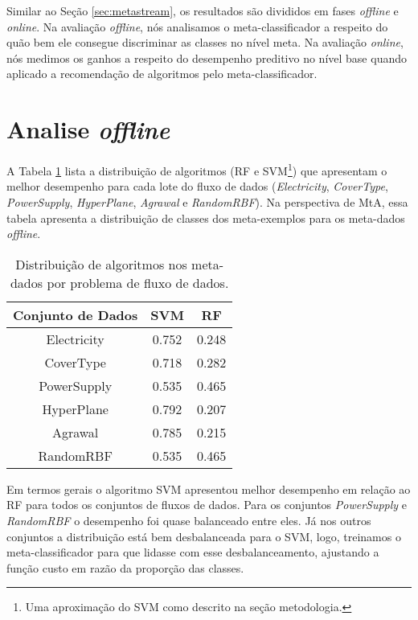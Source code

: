 \label{chap:resultados}
Similar ao Seção \ref{sec:metastream}, os resultados são divididos em fases \textit{offline} e \textit{online}. Na avaliação \textit{offline}, nós analisamos o meta-classificador a respeito do quão bem ele consegue discriminar as classes no nível meta. Na avaliação \textit{online}, nós medimos os ganhos a respeito do desempenho preditivo no nível base quando aplicado a recomendação de algoritmos pelo meta-classificador.

\section{Analise \textit{offline}}

A Tabela \ref{tab:algo_dist} lista a distribuição de algoritmos (RF e SVM\footnote{Uma aproximação do SVM como descrito na seção metodologia.}) que apresentam o melhor desempenho para cada lote do fluxo de dados (\textit{Electricity}, \textit{CoverType}, \textit{PowerSupply}, \textit{HyperPlane}, \textit{Agrawal} e \textit{RandomRBF}). Na perspectiva de MtA, essa tabela apresenta a distribuição de classes dos meta-exemplos para os meta-dados \textit{offline}.

\begin{table}[ht]
\caption{Distribuição de algoritmos nos meta-dados por problema de fluxo de dados.}
\label{tab:algo_dist}
\centering
\begin{tabular}{c|c|c} \hline
    Conjunto de Dados & SVM   & RF    \\ \hline
    Electricity       & 0.752 & 0.248 \\
    CoverType         & 0.718 & 0.282 \\
    PowerSupply       & 0.535 & 0.465 \\ \hline
    HyperPlane        & 0.792 & 0.207 \\
    Agrawal           & 0.785 & 0.215 \\
    RandomRBF         & 0.535 & 0.465 \\
\end{tabular}
\end{table}

Em termos gerais o algoritmo SVM apresentou melhor desempenho em relação ao RF para todos
os conjuntos de fluxos de dados. Para os conjuntos \textit{PowerSupply} e \textit{RandomRBF} o desempenho foi quase balanceado entre eles. Já nos outros conjuntos a distribuição está bem
desbalanceada para o SVM, logo, treinamos o meta-classificador para que lidasse com esse
desbalanceamento,  ajustando a função custo em razão da proporção das classes. 

